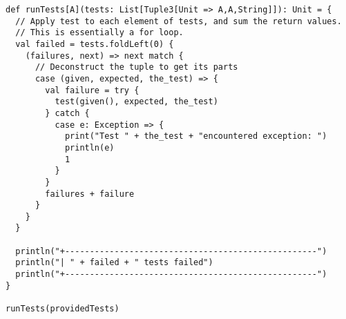 \documentclass[11pt]{article}
\theoremstyle{definition}
\begin{document}
\begin{verbatim}
def runTests[A](tests: List[Tuple3[Unit => A,A,String]]): Unit = {
  // Apply test to each element of tests, and sum the return values.
  // This is essentially a for loop.
  val failed = tests.foldLeft(0) {
    (failures, next) => next match {
      // Deconstruct the tuple to get its parts
      case (given, expected, the_test) => {
        val failure = try {
          test(given(), expected, the_test)
        } catch {
          case e: Exception => {
            print("Test " + the_test + "encountered exception: ")
            println(e)
            1
          }
        }
        failures + failure
      }
    }
  }
  
  println("+---------------------------------------------------")
  println("| " + failed + " tests failed")
  println("+---------------------------------------------------")
}

runTests(providedTests)
\end{verbatim}
\end{document}
